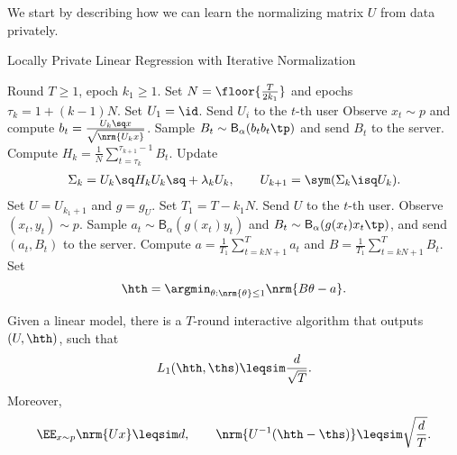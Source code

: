
We start by describing how we can learn the normalizing matrix $U$ from data privately.


\newcommand{\prB}[1]{\mathsf{B}_{\alpha}(#1)}
\newcommand{\CMT}[1]{\STATE {\color{blue} //#1}}
\begin{algorithm}[t]
\caption{Locally Private Linear Regression with Iterative Normalization}\label{alg:LR-normal}
\begin{algorithmic}[1]
\REQUIRE Round $T\geq 1$, epoch $k_1\geq 1$.
\STATE Set $N=\floor{\frac{T}{2k_1}}$ and epochs $\tau_k=1+(k-1)N$.
\STATE Set $U_1=\id$.
        \STATE Send $U_i$ to the $t$-th user
        \CMT{ At $t$-th user: }
        \STATE Observe $x_t\sim p$ and compute $b_t=\frac{U_k\sq x}{\sqrt{\nrm{U_kx}}}$.
        \STATE Sample $B_t\sim \prB{b_tb_t\tp}$ and send $B_t$ to the server.    
    \ENDFOR
    \STATE Compute $H_k=\frac1N\sum_{t=\tau_k}^{\tau_{k+1}-1} B_t$.
    \STATE Update
    \begin{align*}
        \Sigma_k=U_k\sq H_k U_k\sq+\lambda_k U_k, \qquad
        U_{k+1}=\sym(\Sigma_k\isq U_k).
    \end{align*}
\ENDFOR
\STATE Set $U=U_{k_1+1}$ and $g=g_{U}$. Set $T_1=T-k_1N$.
    \STATE Send $U$ to the $t$-th user.
    \CMT{At $t$-th user}
    \STATE Observe $(x_t,y_t)\sim p$.
    \STATE Sample $a_t\sim \prB{g(x_t)y_t}$ and $B_t\sim \prB{ g(x_t)x_t\tp }$, and send $(a_t,B_t)$ to the server.
\ENDFOR
\STATE Compute $a=\frac{1}{T_1}\sum_{t=kN+1}^T a_t$ and $B=\frac{1}{T_1}\sum_{t=kN+1}^T B_t$.
\STATE Set
\begin{align*}
    \hth=\argmin_{\theta: \nrm{\theta}\leq 1} \nrm{B\theta-a}.
\end{align*}
\end{algorithmic}
\end{algorithm}

\begin{theorem}
Given a linear model, there is a $T$-round interactive algorithm that outputs $(U,\hth)$, such that
\begin{align*}
    L_1(\hth,\ths)\leqsim \frac{d}{\sqrt{T}}.
\end{align*}
Moreover,
\begin{align*}
    \EE_{x\sim p} \nrm{Ux}\leqsim d, \qquad
    \nrm{U^{-1}(\hth-\ths)}\leqsim \sqrt{\frac{d}{T}}.
\end{align*}
\end{theorem}



